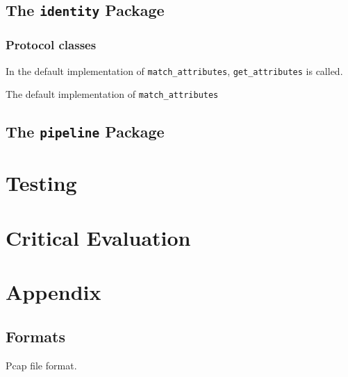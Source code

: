 \documentclass[10pt,a4paper,notitlepage]{report}
\begin{document}
\section{The \texttt{identity} Package}
\subsection{Protocol classes}
In the default implementation of \texttt{match_attributes}, \texttt{get_attributes} is called.

The default implementation of \texttt{match_attributes}
\section{The \texttt{pipeline} Package}

\chapter{Testing}

\chapter{Critical Evaluation}

\chapter{Appendix}
\section{Formats}
Pcap file format.


\end{document}
